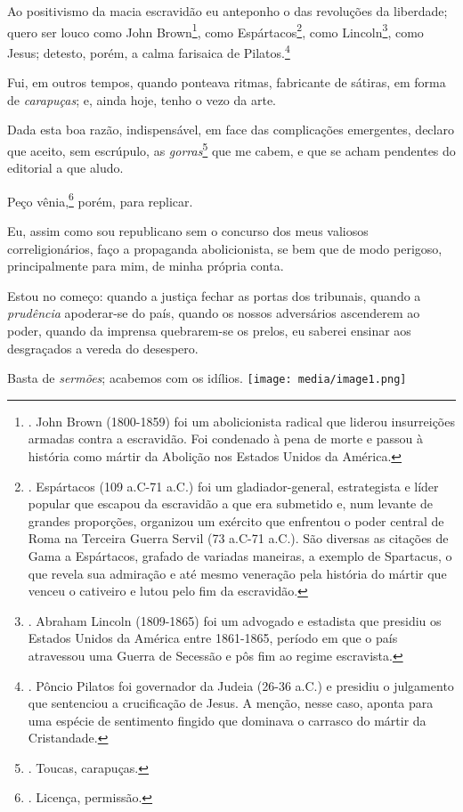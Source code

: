 Ao positivismo da macia escravidão eu anteponho o das revoluções da
liberdade; quero ser louco como John Brown\footnote{. John Brown
  (1800-1859) foi um abolicionista radical que liderou insurreições
  armadas contra a escravidão. Foi condenado à pena de morte e passou à
  história como mártir da Abolição nos Estados Unidos da América.}, como
Espártacos\footnote{. Espártacos (109 a.C-71 a.C.) foi um
  gladiador-general, estrategista e líder popular que escapou da
  escravidão a que era submetido e, num levante de grandes proporções,
  organizou um exército que enfrentou o poder central de Roma na
  Terceira Guerra Servil (73 a.C-71 a.C.). São diversas as citações de
  Gama a Espártacos, grafado de variadas maneiras, a exemplo de
  Spartacus, o que revela sua admiração e até mesmo veneração pela
  história do mártir que venceu o cativeiro e lutou pelo fim da
  escravidão.}, como Lincoln\footnote{. Abraham Lincoln (1809-1865) foi
  um advogado e estadista que presidiu os Estados Unidos da América
  entre 1861-1865, período em que o país atravessou uma Guerra de
  Secessão e pôs fim ao regime escravista.}, como Jesus; detesto, porém,
a calma farisaica de Pilatos.\footnote{. Pôncio Pilatos foi governador
  da Judeia (26-36 a.C.) e presidiu o julgamento que sentenciou a
  crucificação de Jesus. A menção, nesse caso, aponta para uma espécie
  de sentimento fingido que dominava o carrasco do mártir da
  Cristandade.}

Fui, em outros tempos, quando ponteava ritmas, fabricante de sátiras, em
forma de \emph{carapuças}; e, ainda hoje, tenho o vezo da arte.

Dada esta boa razão, indispensável, em face das complicações emergentes,
declaro que aceito, sem escrúpulo, as \emph{gorras}\footnote{. Toucas,
  carapuças.} que me cabem, e que se acham pendentes do editorial a que
aludo.

Peço vênia,\footnote{. Licença, permissão.} porém, para replicar.

Eu, assim como sou republicano sem o concurso dos meus valiosos
correligionários, faço a propaganda abolicionista, se bem que de modo
perigoso, principalmente para mim, de minha própria conta.

Estou no começo: quando a justiça fechar as portas dos tribunais, quando
a \emph{prudência} apoderar-se do país, quando os nossos adversários
ascenderem ao poder, quando da imprensa quebrarem-se os prelos, eu
saberei ensinar aos desgraçados a vereda do desespero.

Basta de \emph{sermões}; acabemos com os idílios.
\texttt{[image: media/image1.png]}

